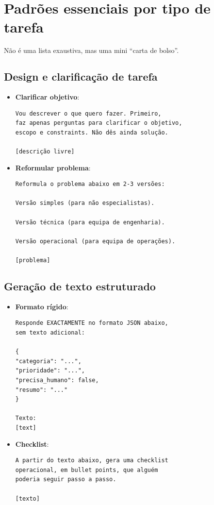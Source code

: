 \section{Padrões essenciais por tipo de tarefa}

Não é uma lista exaustiva, mas uma mini “carta de bolso”.

\subsection*{Design e clarificação de tarefa}

\begin{itemize}[leftmargin=*]
\item \textbf{Clarificar objetivo}:
\begin{lstlisting}
Vou descrever o que quero fazer. Primeiro,
faz apenas perguntas para clarificar o objetivo,
escopo e constraints. Não dês ainda solução.

[descrição livre]
\end{lstlisting}
\item \textbf{Reformular problema}:
\begin{lstlisting}
Reformula o problema abaixo em 2-3 versões:

Versão simples (para não especialistas).

Versão técnica (para equipa de engenharia).

Versão operacional (para equipa de operações).

[problema]
\end{lstlisting}
\end{itemize}

\subsection*{Geração de texto estruturado}

\begin{itemize}[leftmargin=*]
\item \textbf{Formato rígido}:
\begin{lstlisting}
Responde EXACTAMENTE no formato JSON abaixo,
sem texto adicional:

{
"categoria": "...",
"prioridade": "...",
"precisa_humano": false,
"resumo": "..."
}

Texto:
[text]
\end{lstlisting}
\item \textbf{Checklist}:
\begin{lstlisting}
A partir do texto abaixo, gera uma checklist
operacional, em bullet points, que alguém
poderia seguir passo a passo.

[texto]
\end{lstlisting}
\end{itemize}

